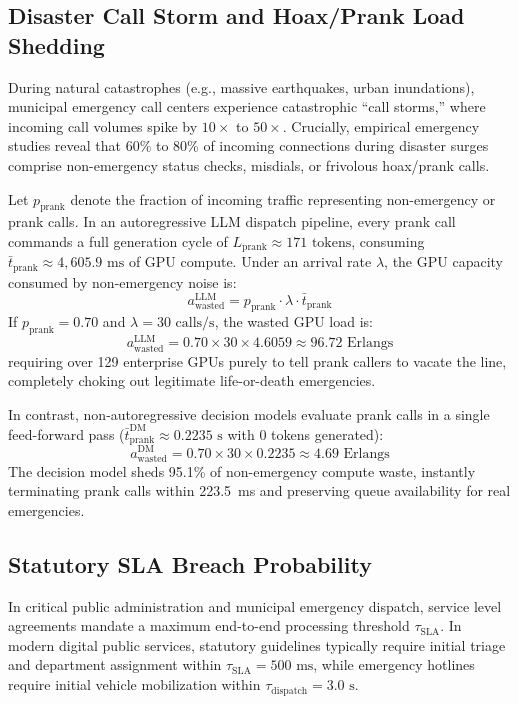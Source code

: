 \documentclass[journal,compsoc]{IEEEtran}
\begin{document}
\subsection{Disaster Call Storm and Hoax/Prank Load Shedding}
During natural catastrophes (e.g., massive earthquakes, urban inundations), municipal emergency call centers experience catastrophic ``call storms,'' where incoming call volumes spike by $10\times$ to $50\times$. Crucially, empirical emergency studies reveal that 60\% to 80\% of incoming connections during disaster surges comprise non-emergency status checks, misdials, or frivolous hoax/prank calls.

Let $p_{\text{prank}}$ denote the fraction of incoming traffic representing non-emergency or prank calls. In an autoregressive LLM dispatch pipeline, every prank call commands a full generation cycle of $L_{\text{prank}} \approx 171 \text{ tokens}$, consuming $\bar{t}_{\text{prank}} \approx 4,605.9 \text{ ms}$ of GPU compute. Under an arrival rate $\lambda$, the GPU capacity consumed by non-emergency noise is:
\begin{equation}
a_{\text{wasted}}^{\text{LLM}} = p_{\text{prank}} \cdot \lambda \cdot \bar{t}_{\text{prank}}
\end{equation}
If $p_{\text{prank}} = 0.70$ and $\lambda = 30 \text{ calls/s}$, the wasted GPU load is:
\begin{equation}
a_{\text{wasted}}^{\text{LLM}} = 0.70 \times 30 \times 4.6059 \approx 96.72 \text{ Erlangs}
\end{equation}
requiring over 129 enterprise GPUs purely to tell prank callers to vacate the line, completely choking out legitimate life-or-death emergencies.

In contrast, non-autoregressive decision models evaluate prank calls in a single feed-forward pass ($\bar{t}_{\text{prank}}^{\text{DM}} \approx 0.2235 \text{ s}$ with 0 tokens generated):
\begin{equation}
a_{\text{wasted}}^{\text{DM}} = 0.70 \times 30 \times 0.2235 \approx 4.69 \text{ Erlangs}
\end{equation}
The decision model sheds 95.1\% of non-emergency compute waste, instantly terminating prank calls within 223.5~ms and preserving queue availability for real emergencies.

\subsection{Statutory SLA Breach Probability}
In critical public administration and municipal emergency dispatch, service level agreements mandate a maximum end-to-end processing threshold $\tau_{\text{SLA}}$. In modern digital public services, statutory guidelines typically require initial triage and department assignment within $\tau_{\text{SLA}} = 500 \text{ ms}$, while emergency hotlines require initial vehicle mobilization within $\tau_{\text{dispatch}} = 3.0 \text{ s}$.
\end{document}
